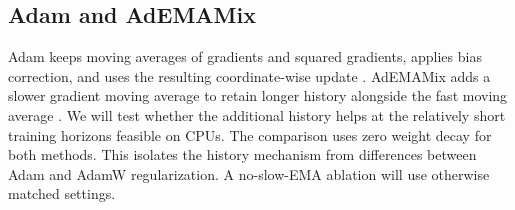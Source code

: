 \subsection{Adam and AdEMAMix}\label{sec:method-m4}

Adam keeps moving averages of gradients and squared gradients, applies bias correction,
and uses the resulting coordinate-wise update \citep{kingma2015adam}.
AdEMAMix adds a slower gradient moving average to retain longer history alongside the
fast moving average \citep{pagliardini2025ademamix}.
We will test whether the additional history helps at the relatively short training horizons
feasible on CPUs. The comparison uses zero weight decay for both methods. This isolates the
history mechanism from differences between Adam and AdamW regularization. A no-slow-EMA
ablation will use otherwise matched settings.

